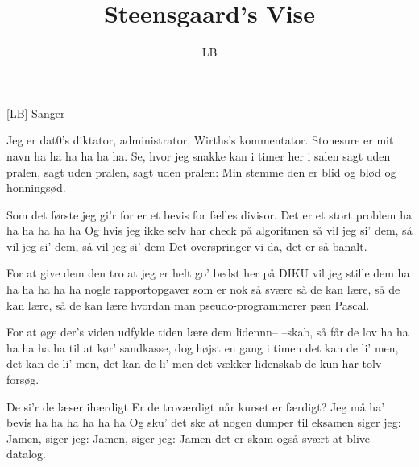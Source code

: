 \documentclass[a4paper,11pt]{article}
\title{Steensgaard's Vise}
\author{LB}
\begin{document}
\maketitle

\begin{roles}
[LB] Sanger
\end{roles}

\begin{song}
   Jeg er dat0's diktator,
administrator,
Wirths's kommentator.
Stonesure er mit navn
ha ha ha ha ha ha.
Se, hvor jeg snakke kan i timer her i salen
sagt uden pralen, sagt uden pralen, sagt uden pralen:
Min stemme den er blid og blød og honningsød.

Som det første jeg gi'r for
er et bevis for
fælles divisor.
Det er et stort problem
ha ha ha ha ha ha
Og hvis jeg ikke selv har check på algoritmen
så vil jeg si' dem, så vil jeg si' dem, så vil jeg si' dem
Det overspringer vi da, det er så banalt.

For at give dem den tro
at jeg er helt go'
bedst her på DIKU
vil jeg stille dem
ha ha ha ha ha ha
nogle rapportopgaver som er nok så svære
så de kan lære, så de kan lære, så de kan lære
hvordan man pseudo-programmerer pæn Pascal.

For at øge der's viden
udfylde tiden
lære dem lidennn--
--skab, så får de lov
ha ha ha ha ha ha
til at kør' sandkasse, dog højst en gang i timen
det kan de li' men, det kan de li' men, det kan de li' men
det vækker lidenskab de kun har tolv forsøg.

De si'r de læser ihærdigt
Er de troværdigt
når kurset er færdigt?
Jeg må ha' bevis
ha ha ha ha ha ha
Og sku' det ske at nogen dumper til eksamen
siger jeg: Jamen, siger jeg: Jamen, siger jeg: Jamen
det er skam også svært at blive datalog.

\end{song}
\end{document}

